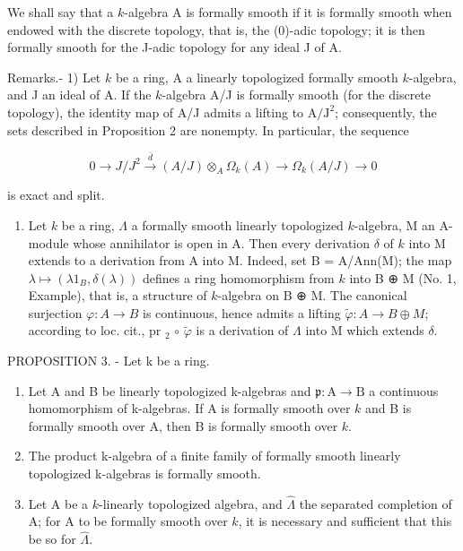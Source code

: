We shall say that a \(k\)-algebra A is formally smooth if it is formally smooth when endowed with the discrete topology, that is, the (0)-adic topology; it is then formally smooth for the J-adic topology for any ideal J of A.

Remarks.- 1) Let \(k\) be a ring, A a linearly topologized formally smooth \(k\)-algebra, and J an ideal of A. If the \(k\)-algebra A/J is formally smooth (for the discrete topology), the identity map of A/J admits a lifting to \(\mathrm{A} / \mathrm{J}^2\); consequently, the sets described in Proposition 2 are nonempty. In particular, the sequence

\[
0 \to J / J ^ {2} \xrightarrow {\bar {d}} (A / J) \otimes_ {A} \Omega_ {k} (A) \longrightarrow \Omega_ {k} (A / J) \to 0
\]

is exact and split.

\begin{enumerate}
\def\labelenumi{\arabic{enumi})}
\setcounter{enumi}{1}
\tightlist
\item
  Let \(k\) be a ring, \(\Lambda\) a formally smooth linearly topologized \(k\)-algebra, M an A-module whose annihilator is open in A. Then every derivation \(\delta\) of \(k\) into M extends to a derivation from A into M. Indeed, set B = A/Ann(M); the map \(\lambda \mapsto (\lambda 1_{B}, \delta(\lambda))\) defines a ring homomorphism from \(k\) into B ⊕ M (No. 1, Example), that is, a structure of \(k\)-algebra on B ⊕ M. The canonical surjection \(\varphi: A \to B\) is continuous, hence admits a lifting \(\tilde{\varphi}: A \to B \oplus M\); according to loc. cit., pr \(_{2}\) \(\circ\) \(\tilde{\varphi}\) is a derivation of \(\Lambda\) into M which extends \(\delta\).
\end{enumerate}

PROPOSITION 3. - Let k be a ring.

\begin{enumerate}
\def\labelenumi{\alph{enumi})}
\item
  Let A and B be linearly topologized k-algebras and \(\mathfrak{p}: \mathrm{A} \to \mathrm{B}\) a continuous homomorphism of k-algebras. If A is formally smooth over \(k\) and B is formally smooth over A, then B is formally smooth over \(k\).
\item
  The product k-algebra of a finite family of formally smooth linearly topologized k-algebras is formally smooth.
\item
  Let A be a \(k\)-linearly topologized algebra, and \(\hat{\Lambda}\) the separated completion of A; for A to be formally smooth over \(k\), it is necessary and sufficient that this be so for \(\hat{\Lambda}\).
\end{enumerate}

